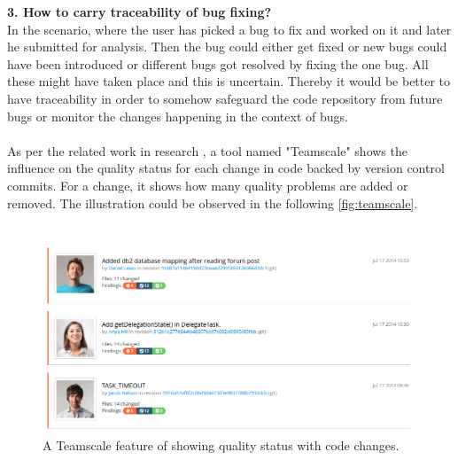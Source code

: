 \textbf{3. How to carry traceability of bug fixing?} \\

In the scenario, where the user has picked a bug to fix and worked on it and later he submitted for analysis. Then the bug could either get fixed or new bugs could have been introduced or different bugs got resolved by fixing the one bug. All these might have taken place and this is uncertain. Thereby it would be better to have traceability in order to somehow safeguard the code repository from future bugs or monitor the changes happening in the context of bugs. \\ \\

As per the related work in research \cite{heinemann2014teamscale}, a tool named "Teamscale" \cite{teamscale} shows the influence on the quality status for each change in code backed by version control commits. For a change, it shows how many quality problems are added or removed. The illustration could be observed in the following \autoref{fig:teamscale}.\\ \\

\begin{figure}[hbt!]
	\centering
	\includegraphics[width=\linewidth]{figures/teamscale}
	\caption{A Teamscale feature of showing quality status with code changes. \cite{teamscale}}
	\label{fig:teamscale}
\end{figure}

\let\cleardoublepage\clearpage
